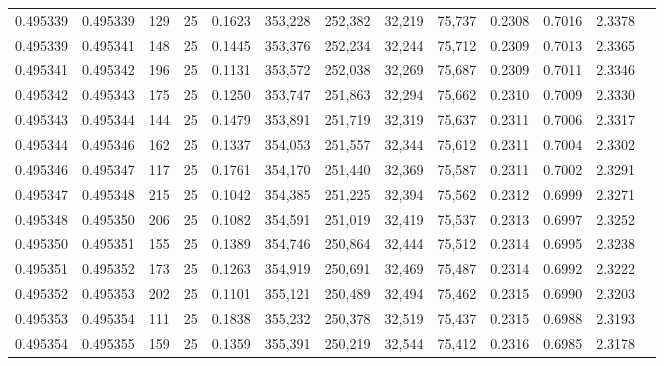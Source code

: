 \begin{tabular}{rrrrrrrrrrrrr}
0.495339 & 0.495339 &   129 &  25 &                                     0.1623 & 353,228 & 252,382 &  32,219 &  75,737 & 0.2308 & 0.7016 & 2.3378 \\
0.495339 & 0.495341 &   148 &  25 &                                     0.1445 & 353,376 & 252,234 &  32,244 &  75,712 & 0.2309 & 0.7013 & 2.3365 \\
0.495341 & 0.495342 &   196 &  25 &                                     0.1131 & 353,572 & 252,038 &  32,269 &  75,687 & 0.2309 & 0.7011 & 2.3346 \\
0.495342 & 0.495343 &   175 &  25 &                                     0.1250 & 353,747 & 251,863 &  32,294 &  75,662 & 0.2310 & 0.7009 & 2.3330 \\
0.495343 & 0.495344 &   144 &  25 &                                     0.1479 & 353,891 & 251,719 &  32,319 &  75,637 & 0.2311 & 0.7006 & 2.3317 \\
0.495344 & 0.495346 &   162 &  25 &                                     0.1337 & 354,053 & 251,557 &  32,344 &  75,612 & 0.2311 & 0.7004 & 2.3302 \\
0.495346 & 0.495347 &   117 &  25 &                                     0.1761 & 354,170 & 251,440 &  32,369 &  75,587 & 0.2311 & 0.7002 & 2.3291 \\
0.495347 & 0.495348 &   215 &  25 &                                     0.1042 & 354,385 & 251,225 &  32,394 &  75,562 & 0.2312 & 0.6999 & 2.3271 \\
0.495348 & 0.495350 &   206 &  25 &                                     0.1082 & 354,591 & 251,019 &  32,419 &  75,537 & 0.2313 & 0.6997 & 2.3252 \\
0.495350 & 0.495351 &   155 &  25 &                                     0.1389 & 354,746 & 250,864 &  32,444 &  75,512 & 0.2314 & 0.6995 & 2.3238 \\
0.495351 & 0.495352 &   173 &  25 &                                     0.1263 & 354,919 & 250,691 &  32,469 &  75,487 & 0.2314 & 0.6992 & 2.3222 \\
0.495352 & 0.495353 &   202 &  25 &                                     0.1101 & 355,121 & 250,489 &  32,494 &  75,462 & 0.2315 & 0.6990 & 2.3203 \\
0.495353 & 0.495354 &   111 &  25 &                                     0.1838 & 355,232 & 250,378 &  32,519 &  75,437 & 0.2315 & 0.6988 & 2.3193 \\
0.495354 & 0.495355 &   159 &  25 &                                     0.1359 & 355,391 & 250,219 &  32,544 &  75,412 & 0.2316 & 0.6985 & 2.3178 \\

\end{tabular}
